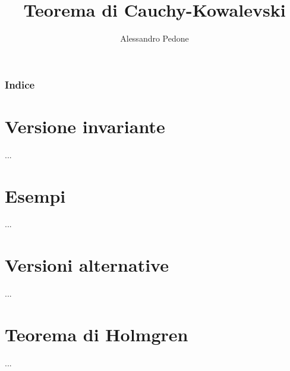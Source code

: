 \documentclass{beamer}
\title{Teorema di Cauchy-Kowalevski}
\author{Alessandro Pedone}
\institute{Politecnico di Milano}
\date{}
\begin{document}
\frame{\titlepage}
\begin{frame}
    \frametitle{Indice}
    \tableofcontents
\end{frame}

\section{Versione invariante}
\begin{frame}
...
\end{frame}
\section{Esempi}
\begin{frame}
...
\end{frame}
\section{Versioni alternative}
\begin{frame}
...
\end{frame}
\section{Teorema di Holmgren}
\begin{frame}
...
\end{frame}
\end{document}
